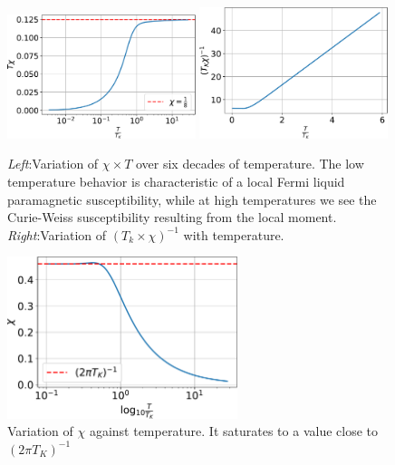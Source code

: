 \documentclass[twoside,11pt]{report}
\numberwithin{equation}{section}
\begin{document}
\begin{figure}[htpb!]
	\centering
	\includegraphics[width=0.49\textwidth]{../figures/chi_T_new.pdf}
	\includegraphics[width=0.49\textwidth]{../figures/one_over_chi_new.pdf}
	\caption{\textit{Left}:Variation of $\chi \times T$ over six decades of temperature. The low temperature behavior is characteristic of a local Fermi liquid paramagnetic susceptibility, while at high temperatures we see the Curie-Weiss susceptibility resulting from the local moment. \textit{Right}:Variation of \(\left(T_k \times \chi\right)^{-1}\) with temperature.}
	\label{sus_spin}
\end{figure}
\begin{figure}[htpb]
	\centering
	\includegraphics[width=0.6\textwidth]{../figures/chi_new.pdf}
	\caption{Variation of $\chi$ against temperature. It saturates to a value close to \(\left( 2\pi T_K \right) ^{-1}\)}
	\label{sus_T}
\end{figure}
\end{document}
